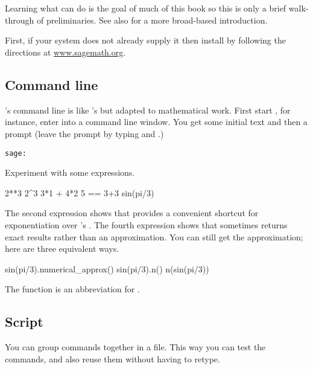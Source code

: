 \section{\Sage}
Learning what \Sage{} can do is the goal of much of this book 
so this is only a brief walk-through of preliminaries.
See also \citep{SageTeam12} for a more broad-based introduction.

First, if your system does not already supply it then install \Sage{} 
by following the directions at
\href{http://www.sagemath.org}{www.sagemath.org}.



\subsection{Command line}
\Sage's command line is like \python's but adapted to 
mathematical work.
First start \Sage,
for instance, enter  into a command line window.
You get some initial text and then a prompt
(leave the prompt by typing 
and .)
\begin{lstlisting}[style=python]
sage:  
\end{lstlisting}

Experiment with some expressions.
\begin{sageoutput}
2**3                                                                      
2^3
3*1 + 4*2
5 == 3+3
sin(pi/3)
\end{sageoutput}
The second expression 
shows that \Sage{} provides a convenient shortcut for exponentiation over
\python's .
The fourth expression
shows that \Sage{} sometimes returns exact results rather than an
approximation.
You can still get the approximation; here are three equivalent ways.
\begin{sageoutput}
sin(pi/3).numerical_approx()
sin(pi/3).n()
n(sin(pi/3))  
\end{sageoutput}
\noindent
The function  is an abbreviation for 
.


\subsection{Script}
You can group \Sage{} commands together in a file.
This way you can test the commands, 
and also reuse them without having to retype.


